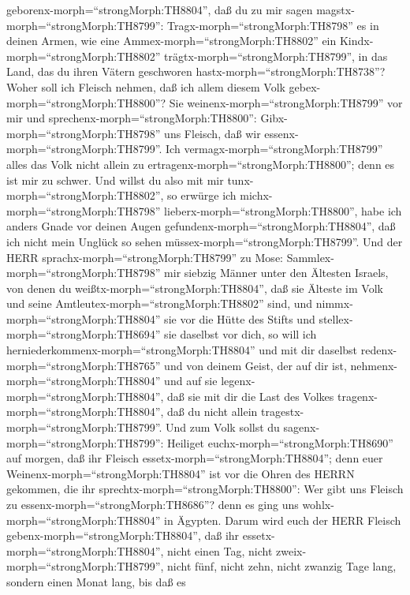 geborenx-morph=``strongMorph:TH8804'', daß du zu mir sagen
magstx-morph=``strongMorph:TH8799'': Tragx-morph=``strongMorph:TH8798''
es in deinen Armen, wie eine Ammex-morph=``strongMorph:TH8802'' ein
Kindx-morph=``strongMorph:TH8802'' trägtx-morph=``strongMorph:TH8799'',
in das Land, das du ihren Vätern geschworen
hastx-morph=``strongMorph:TH8738''?  Woher soll ich Fleisch
nehmen, daß ich allem diesem Volk gebex-morph=``strongMorph:TH8800''?
Sie weinenx-morph=``strongMorph:TH8799'' vor mir und
sprechenx-morph=``strongMorph:TH8800'':
Gibx-morph=``strongMorph:TH8798'' uns Fleisch, daß wir
essenx-morph=``strongMorph:TH8799''.  Ich
vermagx-morph=``strongMorph:TH8799'' alles das Volk nicht allein zu
ertragenx-morph=``strongMorph:TH8800''; denn es ist mir zu schwer.
 Und willst du also mit mir
tunx-morph=``strongMorph:TH8802'', so erwürge ich
michx-morph=``strongMorph:TH8798'' lieberx-morph=``strongMorph:TH8800'',
habe ich anders Gnade vor deinen Augen
gefundenx-morph=``strongMorph:TH8804'', daß ich nicht mein Unglück so
sehen müssex-morph=``strongMorph:TH8799''.  Und der HERR
sprachx-morph=``strongMorph:TH8799'' zu Mose:
Sammlex-morph=``strongMorph:TH8798'' mir siebzig Männer unter den
Ältesten Israels, von denen du weißtx-morph=``strongMorph:TH8804'', daß
sie Älteste im Volk und seine Amtleutex-morph=``strongMorph:TH8802''
sind, und nimmx-morph=``strongMorph:TH8804'' sie vor die Hütte des
Stifts und stellex-morph=``strongMorph:TH8694'' sie daselbst vor dich,
 so will ich herniederkommenx-morph=``strongMorph:TH8804''
und mit dir daselbst redenx-morph=``strongMorph:TH8765'' und von deinem
Geist, der auf dir ist, nehmenx-morph=``strongMorph:TH8804'' und auf sie
legenx-morph=``strongMorph:TH8804'', daß sie mit dir die Last des Volkes
tragenx-morph=``strongMorph:TH8804'', daß du nicht allein
tragestx-morph=``strongMorph:TH8799''.  Und zum Volk sollst
du sagenx-morph=``strongMorph:TH8799'': Heiliget
euchx-morph=``strongMorph:TH8690'' auf morgen, daß ihr Fleisch
essetx-morph=``strongMorph:TH8804''; denn euer
Weinenx-morph=``strongMorph:TH8804'' ist vor die Ohren des HERRN
gekommen, die ihr sprechtx-morph=``strongMorph:TH8800'': Wer gibt uns
Fleisch zu essenx-morph=``strongMorph:TH8686''? denn es ging uns
wohlx-morph=``strongMorph:TH8804'' in Ägypten. Darum wird euch der HERR
Fleisch gebenx-morph=``strongMorph:TH8804'', daß ihr
essetx-morph=``strongMorph:TH8804'',  nicht einen Tag,
nicht zweix-morph=``strongMorph:TH8799'', nicht fünf, nicht zehn, nicht
zwanzig Tage lang,  sondern einen Monat lang, bis daß es

